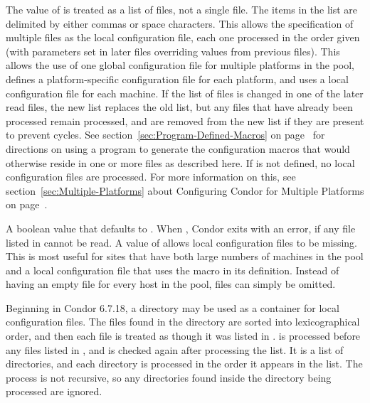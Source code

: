 \begin{description}
  The value of  is treated as a list of files,
  not a
  single file.  The items in the list are delimited by either commas
  or space characters.
  This allows the specification of multiple files as
  the local configuration file, each one processed in the
  order given (with parameters set in later files overriding values
  from previous files).  This allows the use of one global
  configuration file for multiple platforms in the pool, defines a
  platform-specific configuration file for each platform, and uses a
  local configuration file for each machine. 
  If the list of files is changed in one of the later read files, the new list
  replaces the old list, but any files that have already been processed
  remain processed, and are removed from the new list if they are present
  to prevent cycles.
  See section~\ref{sec:Program-Defined-Macros} on 
  page~\pageref{sec:Program-Defined-Macros} for directions on
  using a program to generate the configuration macros that would
  otherwise reside in one or more files as described here.
  If  is not defined, no local configuration
  files are processed.  For more information on this, see
  section~\ref{sec:Multiple-Platforms} about Configuring Condor for
  Multiple Platforms on page~\pageref{sec:Multiple-Platforms}.

\item[\Macro{REQUIRE\_LOCAL\_CONFIG\_FILE}] \label{param:RequireLocalConfigFile}
  A boolean value that defaults to .
  When , Condor exits with an error,
  if any file listed in  cannot be read.
  A value of  allows local configuration files to be missing.
  This is most useful for sites that have 
  both large numbers of machines in the pool and a local configuration file
  that uses the  macro in its definition.
  Instead of having an empty file for every host
  in the pool, files can simply be omitted.

\item[\Macro{LOCAL\_CONFIG\_DIR}] \label{param:LocalConfigDir} 
  Beginning in Condor 6.7.18, a directory may be used as a container for 
  local configuration files. 
  The files found in the directory are sorted into lexicographical order, and 
  then each file is treated as though it was listed in 
  . 
   is processed before any files listed in 
  , and is checked again after processing
  the  list. 
  It is a list of directories, and each directory is processed in the order
  it appears in the list. 
  The process is not recursive, so any directories found inside the directory
  being processed are ignored. 


\end{description}
